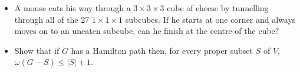 \documentclass[11pt]{article}
\newcommand\itm[1]{\item[\textbf{#1}]}
\begin{document}
\begin{itemize}
  \itm{4.2.2} A mouse eats his way through a \(3 \times 3 \times 3\) cube of cheese by tunnelling through all of the 27 \(1 \times 1 \times 1\) subcubes.  If he starts at one corner and always moves on to an uneaten subcube, can he finish at the centre of the cube?



  \itm{4.2.3} Show that if \(G\) has a Hamilton path then, for every proper subset \(S\) of \(V\), \(\omega(G-S) \leq |S|+1\).

\end{itemize}
\end{document}

